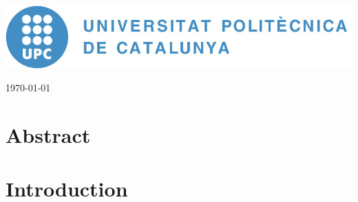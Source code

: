 \documentclass[a4paper,times,numbered,print,index, table, xcdraw]{article}
\let\LaTeXStandardTableOfContents\tableofcontents
\renewcommand{\tableofcontents}{%
\begingroup%
\renewcommand{\bfseries}{\relax}%
\LaTeXStandardTableOfContents%
\endgroup%
}%
\begin{document}
\begin{titlepage}


\begin{minipage}{0.45\textwidth}
\begin{flushright}
    \includegraphics[width=\textwidth]{Figures/Cover/upc.jpeg}%
\end{flushright}
\end{minipage}

\vspace{1.5cm}


{\large \today}\\[2cm] %


\vfill %

\end{titlepage}




\thispagestyle{plain}

\section{Abstract}
\label{chap:abstract}


\section{Introduction}
\label{chap:intro}

\end{document}

